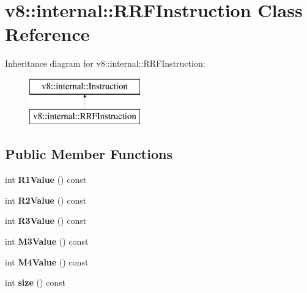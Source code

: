 \hypertarget{classv8_1_1internal_1_1_r_r_f_instruction}{}\section{v8\+:\+:internal\+:\+:R\+R\+F\+Instruction Class Reference}
\label{classv8_1_1internal_1_1_r_r_f_instruction}
Inheritance diagram for v8\+:\+:internal\+:\+:R\+R\+F\+Instruction\+:\begin{figure}[H]
\begin{center}
\leavevmode
\includegraphics[height=2.000000cm]{classv8_1_1internal_1_1_r_r_f_instruction}
\end{center}
\end{figure}
\subsection*{Public Member Functions}
\begin{DoxyCompactItemize}
\item 
int {\bfseries R1\+Value} () const \hypertarget{classv8_1_1internal_1_1_r_r_f_instruction_a5be782f9fcbe994ca4043f355316f6b8}{}\label{classv8_1_1internal_1_1_r_r_f_instruction_a5be782f9fcbe994ca4043f355316f6b8}

\item 
int {\bfseries R2\+Value} () const \hypertarget{classv8_1_1internal_1_1_r_r_f_instruction_afa3724d8bc668c7757160237e173ce7d}{}\label{classv8_1_1internal_1_1_r_r_f_instruction_afa3724d8bc668c7757160237e173ce7d}

\item 
int {\bfseries R3\+Value} () const \hypertarget{classv8_1_1internal_1_1_r_r_f_instruction_aa606ce03b69607466cb8436f862d65ef}{}\label{classv8_1_1internal_1_1_r_r_f_instruction_aa606ce03b69607466cb8436f862d65ef}

\item 
int {\bfseries M3\+Value} () const \hypertarget{classv8_1_1internal_1_1_r_r_f_instruction_ad6c71eaf63e21a9153f2f708661ae7c7}{}\label{classv8_1_1internal_1_1_r_r_f_instruction_ad6c71eaf63e21a9153f2f708661ae7c7}

\item 
int {\bfseries M4\+Value} () const \hypertarget{classv8_1_1internal_1_1_r_r_f_instruction_a9c5b65c7fcf8c806c14090f2392303b9}{}\label{classv8_1_1internal_1_1_r_r_f_instruction_a9c5b65c7fcf8c806c14090f2392303b9}

\item 
int {\bfseries size} () const \hypertarget{classv8_1_1internal_1_1_r_r_f_instruction_a20ee3b25929073031bac4d4a04ca5ef7}{}\label{classv8_1_1internal_1_1_r_r_f_instruction_a20ee3b25929073031bac4d4a04ca5ef7}

\end{DoxyCompactItemize}
